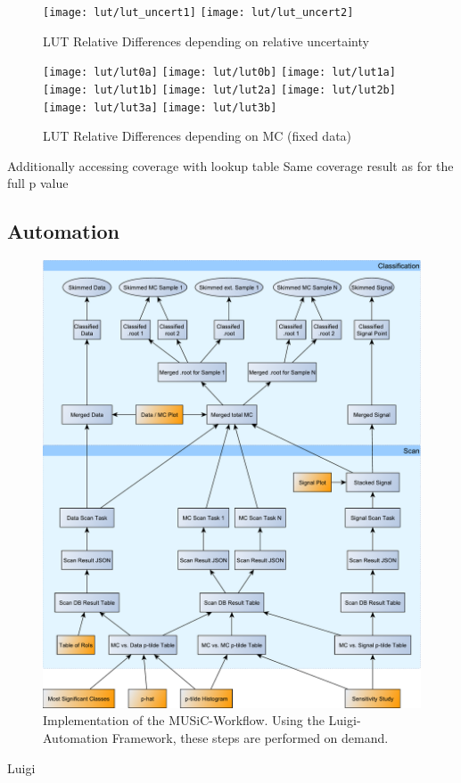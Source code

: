 \begin{figure}
    \centering
    \texttt{[image: lut/lut\_uncert1]}
    \texttt{[image: lut/lut\_uncert2]}
    \caption{LUT Relative Differences depending on relative uncertainty}
    \label{fig:lut_reldiff_reluncert}
\end{figure}

\begin{figure}
    \centering
    \texttt{[image: lut/lut0a]}
    \texttt{[image: lut/lut0b]}
    \texttt{[image: lut/lut1a]}
    \texttt{[image: lut/lut1b]}
     \texttt{[image: lut/lut2a]}
    \texttt{[image: lut/lut2b]}
    \texttt{[image: lut/lut3a]}  
    \texttt{[image: lut/lut3b]}
    \caption{LUT Relative Differences depending on MC (fixed data)}
    \label{fig:lut_reldiff_mc}
\end{figure}

Additionally accessing coverage with lookup table
Same coverage result as for the full p value



\subsection{Automation}
\begin{figure}
    \centering
    \includegraphics[width=\textwidth]{../music-workflow}
    \vspace{0.5em}
    \caption{Implementation of the MUSiC-Workflow. Using the Luigi-Automation Framework, these steps are performed on demand.}
    \label{fig:music_workflow}
\end{figure}

Luigi